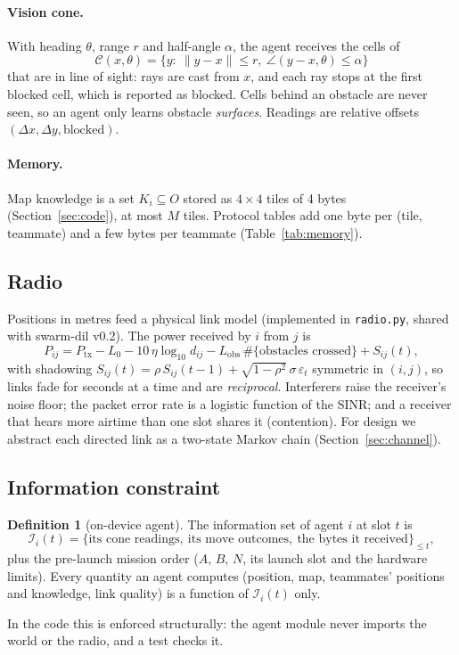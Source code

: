 \documentclass[11pt,a4paper]{article}
\theoremstyle{definition}
\newtheorem{definition}{Definition}
\begin{document}
\paragraph{Vision cone.} With heading $\theta$, range $r$ and half-angle $\alpha$, the agent receives the cells of
\[
\mathcal C(x,\theta)=\{y:\ \|y-x\|\le r,\ \angle(y-x,\theta)\le\alpha\}
\]
that are in line of sight: rays are cast from $x$, and each ray stops at the first blocked cell, which is reported as blocked. Cells behind an obstacle are never seen, so an agent only learns obstacle \emph{surfaces}. Readings are relative offsets $(\Delta x,\Delta y,\text{blocked})$.

\paragraph{Memory.} Map knowledge is a set $K_i\subseteq O$ stored as $4\times4$ tiles of 4 bytes (Section~\ref{sec:code}), at most $M$ tiles. Protocol tables add one byte per (tile, teammate) and a few bytes per teammate (Table~\ref{tab:memory}).

\subsection{Radio}
Positions in metres feed a physical link model (implemented in \texttt{radio.py}, shared with swarm-dil v0.2). The power received by $i$ from $j$ is
\[
P_{ij}=P_{\mathrm{tx}}-L_0-10\,\eta\log_{10}d_{ij}-L_{\mathrm{obs}}\,\#\{\text{obstacles crossed}\}+S_{ij}(t),
\]
with shadowing $S_{ij}(t)=\rho\,S_{ij}(t-1)+\sqrt{1-\rho^2}\,\sigma\,\varepsilon_t$ symmetric in $(i,j)$, so links fade for seconds at a time and are \emph{reciprocal}. Interferers raise the receiver's noise floor; the packet error rate is a logistic function of the SINR; and a receiver that hears more airtime than one slot shares it (contention). For design we abstract each directed link as a two-state Markov chain (Section~\ref{sec:channel}).

\subsection{Information constraint}
\begin{definition}[on-device agent]
The information set of agent $i$ at slot $t$ is
\[
\mathcal I_i(t)=\{\text{its cone readings},\ \text{its move outcomes},\ \text{the bytes it received}\}_{\le t},
\]
plus the pre-launch mission order ($A$, $B$, $N$, its launch slot and the hardware limits). Every quantity an agent computes (position, map, teammates' positions and knowledge, link quality) is a function of $\mathcal I_i(t)$ only.
\end{definition}
In the code this is enforced structurally: the agent module never imports the world or the radio, and a test checks it.
\end{document}
